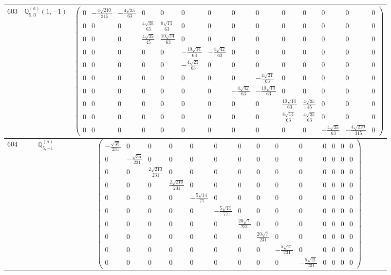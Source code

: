 \documentclass[fleqn,8pt,landscape]{jsarticle}
\begin{document}
\begin{center}
\begin{longtable}{ccc}
$ 603 $ & $ \mathbb{Q}_{5,0}^{(a)}(1,-1) $ & $ \begin{pmatrix} 0 & - \frac{4 \sqrt{210}}{315} & - \frac{4 \sqrt{35}}{63} & 0 & 0 & 0 & 0 & 0 & 0 & 0 & 0 & 0 & 0 & 0 \\ 0 & 0 & 0 & \frac{4 \sqrt{35}}{63} & \frac{8 \sqrt{14}}{63} & 0 & 0 & 0 & 0 & 0 & 0 & 0 & 0 & 0 \\ 0 & 0 & 0 & \frac{4 \sqrt{35}}{45} & \frac{10 \sqrt{14}}{63} & 0 & 0 & 0 & 0 & 0 & 0 & 0 & 0 & 0 \\ 0 & 0 & 0 & 0 & 0 & - \frac{10 \sqrt{14}}{63} & - \frac{4 \sqrt{42}}{63} & 0 & 0 & 0 & 0 & 0 & 0 & 0 \\ 0 & 0 & 0 & 0 & 0 & - \frac{4 \sqrt{21}}{63} & 0 & 0 & 0 & 0 & 0 & 0 & 0 & 0 \\ 0 & 0 & 0 & 0 & 0 & 0 & 0 & 0 & - \frac{4 \sqrt{21}}{63} & 0 & 0 & 0 & 0 & 0 \\ 0 & 0 & 0 & 0 & 0 & 0 & 0 & - \frac{4 \sqrt{42}}{63} & - \frac{10 \sqrt{14}}{63} & 0 & 0 & 0 & 0 & 0 \\ 0 & 0 & 0 & 0 & 0 & 0 & 0 & 0 & 0 & \frac{10 \sqrt{14}}{63} & \frac{4 \sqrt{35}}{45} & 0 & 0 & 0 \\ 0 & 0 & 0 & 0 & 0 & 0 & 0 & 0 & 0 & \frac{8 \sqrt{14}}{63} & \frac{4 \sqrt{35}}{63} & 0 & 0 & 0 \\ 0 & 0 & 0 & 0 & 0 & 0 & 0 & 0 & 0 & 0 & 0 & - \frac{4 \sqrt{35}}{63} & - \frac{4 \sqrt{210}}{315} & 0 \end{pmatrix} $ \\ \hline
$ 604 $ & $ \mathbb{Q}_{5,-1}^{(a)} $ & $ \begin{pmatrix} - \frac{\sqrt{35}}{231} & 0 & 0 & 0 & 0 & 0 & 0 & 0 & 0 & 0 & 0 & 0 & 0 & 0 \\ 0 & - \frac{\sqrt{35}}{231} & 0 & 0 & 0 & 0 & 0 & 0 & 0 & 0 & 0 & 0 & 0 & 0 \\ 0 & 0 & \frac{2 \sqrt{210}}{231} & 0 & 0 & 0 & 0 & 0 & 0 & 0 & 0 & 0 & 0 & 0 \\ 0 & 0 & 0 & \frac{2 \sqrt{210}}{231} & 0 & 0 & 0 & 0 & 0 & 0 & 0 & 0 & 0 & 0 \\ 0 & 0 & 0 & 0 & - \frac{5 \sqrt{14}}{77} & 0 & 0 & 0 & 0 & 0 & 0 & 0 & 0 & 0 \\ 0 & 0 & 0 & 0 & 0 & - \frac{5 \sqrt{14}}{77} & 0 & 0 & 0 & 0 & 0 & 0 & 0 & 0 \\ 0 & 0 & 0 & 0 & 0 & 0 & \frac{20 \sqrt{7}}{231} & 0 & 0 & 0 & 0 & 0 & 0 & 0 \\ 0 & 0 & 0 & 0 & 0 & 0 & 0 & \frac{20 \sqrt{7}}{231} & 0 & 0 & 0 & 0 & 0 & 0 \\ 0 & 0 & 0 & 0 & 0 & 0 & 0 & 0 & - \frac{5 \sqrt{21}}{231} & 0 & 0 & 0 & 0 & 0 \\ 0 & 0 & 0 & 0 & 0 & 0 & 0 & 0 & 0 & - \frac{5 \sqrt{21}}{231} & 0 & 0 & 0 & 0 \end{pmatrix} $ \\ \hline

\end{longtable}
\end{center}
\end{document}
